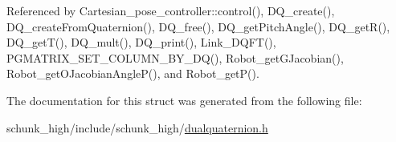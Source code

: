 Referenced by Cartesian\-\_\-pose\-\_\-controller\-::control(), D\-Q\-\_\-create(), D\-Q\-\_\-create\-From\-Quaternion(), D\-Q\-\_\-free(), D\-Q\-\_\-get\-Pitch\-Angle(), D\-Q\-\_\-get\-R(), D\-Q\-\_\-get\-T(), D\-Q\-\_\-mult(), D\-Q\-\_\-print(), Link\-\_\-\-D\-Q\-F\-T(), P\-G\-M\-A\-T\-R\-I\-X\-\_\-\-S\-E\-T\-\_\-\-C\-O\-L\-U\-M\-N\-\_\-\-B\-Y\-\_\-\-D\-Q(), Robot\-\_\-get\-G\-Jacobian(), Robot\-\_\-get\-O\-Jacobian\-Angle\-P(), and Robot\-\_\-get\-P().



The documentation for this struct was generated from the following file\-:\begin{DoxyCompactItemize}
\item 
schunk\-\_\-high/include/schunk\-\_\-high/\hyperlink{dualquaternion_8h}{dualquaternion.\-h}\end{DoxyCompactItemize}

